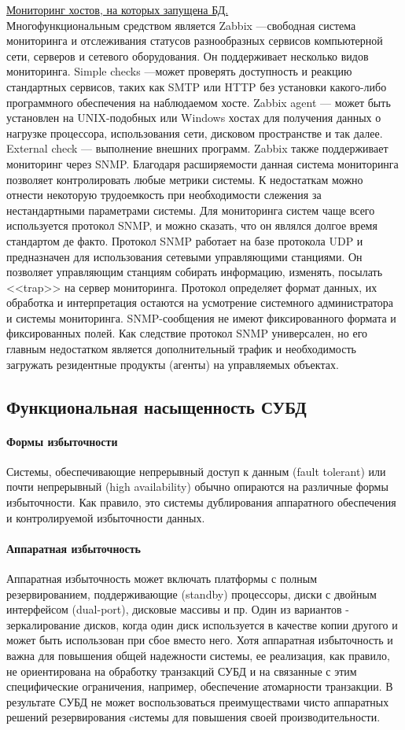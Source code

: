 \underline{Мониторинг хостов, на которых запущена БД.} \\ Многофункциональным средством является Zabbix —свободная система мониторинга и отслеживания статусов разнообразных сервисов компьютерной сети, серверов и сетевого оборудования. Он поддерживает несколько видов мониторинга. Simple checks —может проверять доступность и реакцию стандартных сервисов, таких как SMTP или HTTP без установки какого-либо программного обеспечения на наблюдаемом хосте. Zabbix agent — может быть установлен на UNIX-подобных или Windows хостах для получения данных о нагрузке процессора, использования сети, дисковом пространстве и так далее. External check — выполнение внешних программ. Zabbix также поддерживает мониторинг через SNMP. Благодаря расширяемости данная система мониторинга позволяет контролировать любые метрики системы. К недостаткам можно отнести некоторую трудоемкость при необходимости слежения за нестандартными параметрами системы. Для мониторинга систем чаще всего используется протокол SNMP, и можно сказать, что он являлся долгое время стандартом де факто. Протокол SNMP работает на базе протокола UDP и предназначен для использования сетевыми управляющими станциями. Он позволяет управляющим станциям собирать информацию, изменять, посылать <<trap>> на сервер мониторинга. Протокол определяет формат данных, их обработка и интерпретация остаются на усмотрение системного администратора и системы мониторинга. SNMP-сообщения не имеют фиксированного формата и фиксированных полей. Как следствие протокол SNMP универсален, но его главным недостатком является дополнительный трафик и необходимость загружать резидентные продукты (агенты) на управляемых объектах.

\subsection{Функциональная насыщенность СУБД}
\paragraph{Формы избыточности}
Системы, обеспечивающие непрерывный доступ к данным (fault tolerant) или почти
непрерывный (high availability) обычно опираются на различные формы избыточности.
Как правило, это системы дублирования аппаратного обеспечения и контролируемой
избыточности данных.
\paragraph{Аппаратная избыточность}
Аппаратная избыточность может включать платформы с полным резервированием, поддерживающие (standby) процессоры, диски с двойным интерфейсом (dual-port), дисковые массивы и пр. Один из вариантов - зеркалирование дисков, когда один диск используется в качестве копии другого и может быть использован при сбое вместо него. Хотя аппаратная избыточность и важна для повышения общей надежности системы, ее реализация, как правило, не ориентирована на обработку транзакций СУБД и на связанные с этим специфические ограничения, например, обеспечение атомарности транзакции. В результате СУБД не может воспользоваться преимуществами чисто аппаратных решений резервирования cистемы для повышения своей производительности.

